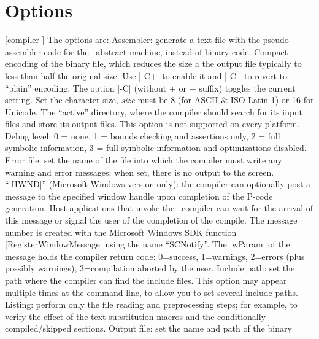 \section{Options}
  [compiler \midtilde]
The options are:
  
\beginlist{65pt}\compactlist
{} Assembler: generate a text file with the pseudo-assembler code
  for the \Small\ abstract machine, instead of binary code.
  
  Compact encoding of the binary file, which reduces the size
  a the output file typically to less than half the original size. Use |-C+| to
  enable it and |-C-| to revert to ``plain'' encoding. The option |-C| (without
  $+$ or $-$ suffix) toggles the current setting.
 Set the character size, {\it size\/} must be 8 (for ASCII \&
  ISO Latin-1) or 16 for Unicode.
 The ``active'' directory, where the compiler should
  search for its input files and store its output files. This option is not
  supported on every platform.
 Debug level: 0 = none, 1 = bounds checking and assertions
  only, 2 = full symbolic information, 3 = full symbolic information and
  optimizations disabled.
 Error file: set the name of the file into which the
  compiler must write any warning and error messages; when set, there is no
  output to the screen.
 ``|HWND|'' (Microsoft Windows version only): the compiler
  can optionally post a message to the specified window handle upon completion
  of the P-code generation. Host applications that invoke the \Small\ compiler can wait
  for the arrival of this message or signal the user of the completion of the
  compile. The message number is created with the Microsoft Windows SDK function
  |RegisterWindowMessage| using the name ``SCNotify''. The |wParam| of the message
  holds the compiler return code: 0=success, 1=warnings, 2=errors (plus possibly warnings),
  3=compilation aborted by the user.
 Include path: set the path where the compiler can find
  the include files. This option may appear multiple times at the command line,
  to allow you to set several include paths.
 Listing: perform only the file reading and preprocessing steps;
  for example, to verify the effect of the text substitution macros and the
  conditionally compiled\slash skipped sections.
 Output file: set the name and path of the binary
